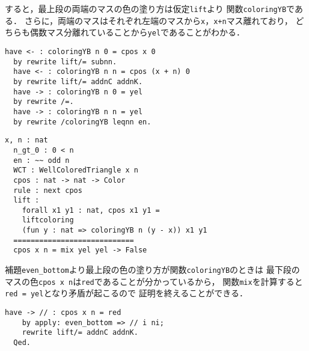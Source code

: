 すると，最上段の両端のマスの色の塗り方は仮定{\tt{lift}}より
関数{\tt{coloringYB}}である．
さらに，両端のマスはそれぞれ左端のマスから{\tt{x}}，{\tt{x+n}}マス離れており，
どちらも偶数マス分離れていることから{\tt{yel}}であることがわかる．
\begin{lstlisting}[language=Coq]
  have <- : coloringYB n 0 = cpos x 0
  by rewrite lift/= subnn.
  have <- : coloringYB n n = cpos (x + n) 0
  by rewrite lift/= addnC addnK.
  have -> : coloringYB n 0 = yel
  by rewrite /=.
  have -> : coloringYB n n = yel
  by rewrite /coloringYB leqnn en.
\end{lstlisting}
\begin{lstlisting}[language=Coq]
  x, n : nat
  n_gt_0 : 0 < n
  en : ~~ odd n
  WCT : WellColoredTriangle x n
  cpos : nat -> nat -> Color
  rule : next cpos
  lift :
    forall x1 y1 : nat, cpos x1 y1 =
    liftcoloring
    (fun y : nat => coloringYB n (y - x)) x1 y1
  ============================
  cpos x n = mix yel yel -> False
\end{lstlisting}
補題{\tt{even\_bottom}}より最上段の色の塗り方が関数{\tt{coloringYB}}のときは
最下段のマスの色{\tt{cpos x n}}は{\tt{red}}であることが分かっているから，
関数{\tt{mix}}を計算すると{\tt{red = yel}}となり矛盾が起こるので
証明を終えることができる．
\begin{lstlisting}[language=Coq]
    have -> // : cpos x n = red
    by apply: even_bottom => // i ni;
    rewrite lift/= addnC addnK.
  Qed.
\end{lstlisting}


